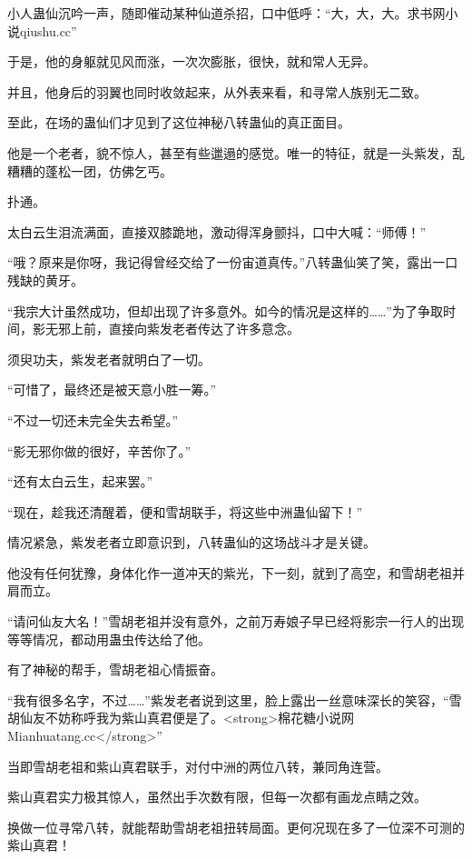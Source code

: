 
\begin{this_body}

小人蛊仙沉吟一声，随即催动某种仙道杀招，口中低呼：“大，大，大。求书网小说qiushu.cc”

于是，他的身躯就见风而涨，一次次膨胀，很快，就和常人无异。

并且，他身后的羽翼也同时收敛起来，从外表来看，和寻常人族别无二致。

至此，在场的蛊仙们才见到了这位神秘八转蛊仙的真正面目。

他是一个老者，貌不惊人，甚至有些邋遢的感觉。唯一的特征，就是一头紫发，乱糟糟的蓬松一团，仿佛乞丐。

扑通。

太白云生泪流满面，直接双膝跪地，激动得浑身颤抖，口中大喊：“师傅！”

“哦？原来是你呀，我记得曾经交给了一份宙道真传。”八转蛊仙笑了笑，露出一口残缺的黄牙。

“我宗大计虽然成功，但却出现了许多意外。如今的情况是这样的……”为了争取时间，影无邪上前，直接向紫发老者传达了许多意念。

须臾功夫，紫发老者就明白了一切。

“可惜了，最终还是被天意小胜一筹。”

“不过一切还未完全失去希望。”

“影无邪你做的很好，辛苦你了。”

“还有太白云生，起来罢。”

“现在，趁我还清醒着，便和雪胡联手，将这些中洲蛊仙留下！”

情况紧急，紫发老者立即意识到，八转蛊仙的这场战斗才是关键。

他没有任何犹豫，身体化作一道冲天的紫光，下一刻，就到了高空，和雪胡老祖并肩而立。

“请问仙友大名！”雪胡老祖并没有意外，之前万寿娘子早已经将影宗一行人的出现等等情况，都动用蛊虫传达给了他。

有了神秘的帮手，雪胡老祖心情振奋。

“我有很多名字，不过……”紫发老者说到这里，脸上露出一丝意味深长的笑容，“雪胡仙友不妨称呼我为紫山真君便是了。<strong>棉花糖小说网Mianhuatang.cc</strong>”

当即雪胡老祖和紫山真君联手，对付中洲的两位八转，兼同角连营。

紫山真君实力极其惊人，虽然出手次数有限，但每一次都有画龙点睛之效。

换做一位寻常八转，就能帮助雪胡老祖扭转局面。更何况现在多了一位深不可测的紫山真君！


\end{this_body}
